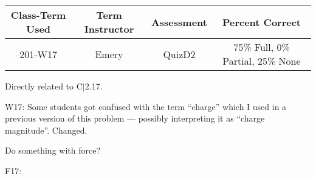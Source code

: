 \begin{outcomes}
	\begin{center}
		\begin{tabular}{cccc}
			\hline\hline
			Class-Term Used & Term Instructor & Assessment & Percent Correct\\
			\hline
			201-W17 & Emery & QuizD2 & 75\% Full, 0\% Partial, 25\% None\\    %
			\hline
		\end{tabular}
	\end{center}
\end{outcomes}

\begin{comments}

Directly related to C$|$2.17.

W17: Some students got confused with the term ``charge'' which I used in a previous version of this problem --- possibly interpreting it as ``charge magnitude''. Changed.

Do something with force?

F17:
	
\end{comments}
